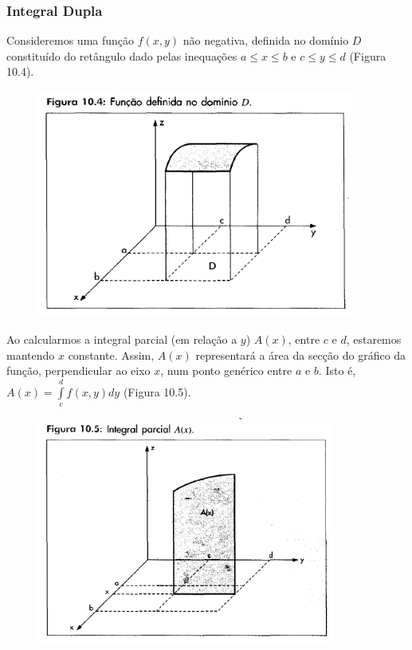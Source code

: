 		\subsubsection{Integral Dupla \cite{morettin}}

			Consideremos uma função $f(x, y)$ não negativa, definida no domínio $D$ constituído do retângulo dado pelas inequações $a \leq x \leq b$ e $c \leq y \leq d$ (Figura 10.4).

			\begin{figure}[H]
				\includegraphics[height=7.5cm]{images/morettin_figura-10-4}
			\end{figure}

			Ao calcularmos a integral parcial (em relação a $y$) $A(x)$, entre $c$ e $d$, estaremos mantendo $x$ constante. Assim, $A(x)$ representará a área da secção do gráfico da função, perpendicular ao eixo $x$, num ponto genérico entre $a$ e $b$. Isto é, $A(x) = \int \limits^{d}_{c} f(x, y)dy$ (Figura 10.5).

			\begin{figure}[H]
				\includegraphics[height=7.5cm]{images/morettin_figura-10-5}
			\end{figure}

